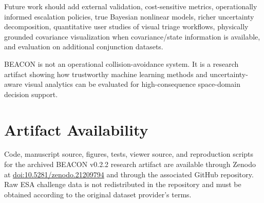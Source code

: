\documentclass[11pt]{article}
\begin{document}
Future work should add external validation, cost-sensitive metrics, operationally informed escalation policies, true Bayesian nonlinear models, richer uncertainty decomposition, quantitative user studies of visual triage workflows, physically grounded covariance visualization when covariance/state information is available, and evaluation on additional conjunction datasets.

BEACON is not an operational collision-avoidance system. It is a research artifact showing how trustworthy machine learning methods and uncertainty-aware visual analytics can be evaluated for high-consequence space-domain decision support.

\section*{Artifact Availability}

Code, manuscript source, figures, tests, viewer source, and reproduction scripts for the archived BEACON v0.2.2 research artifact are available through Zenodo at \href{https://doi.org/10.5281/zenodo.21209794}{doi:10.5281/zenodo.21209794} and through the associated GitHub repository. Raw ESA challenge data is not redistributed in the repository and must be obtained according to the original dataset provider's terms.



\end{document}
